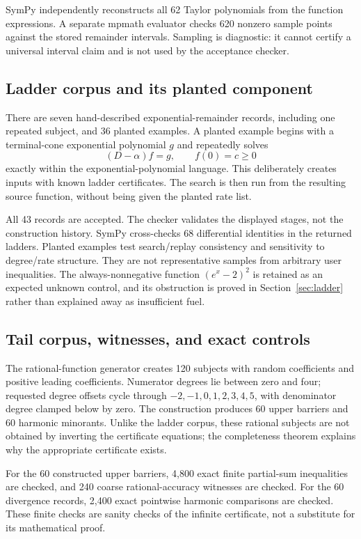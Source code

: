 \documentclass[11pt,a4paper]{article}
\theoremstyle{definition}\newtheorem{definition}[theorem]{Definition}
\newcommand{\Unknown}{\textsf{unknown}}
\begin{document}
SymPy independently reconstructs all 62 Taylor polynomials from the function
expressions. A separate mpmath evaluator checks 620 nonzero sample points against
the stored remainder intervals. Sampling is diagnostic: it cannot certify a
universal interval claim and is not used by the acceptance checker.

\subsection{Ladder corpus and its planted component}

There are seven hand-described exponential-remainder records, including one
repeated subject, and 36 planted examples. A planted example begins with a
terminal-cone exponential polynomial $g$ and repeatedly solves
\[
 (D-\alpha)f=g,\qquad f(0)=c\ge0
\]
exactly within the exponential-polynomial language. This deliberately creates
inputs with known ladder certificates. The search is then run from the resulting
source function, without being given the planted rate list.

All 43 records are accepted. The checker validates the displayed stages, not the
construction history. SymPy cross-checks 68 differential identities in the
returned ladders. Planted examples test search/replay consistency and sensitivity
to degree/rate structure. They are not representative samples from arbitrary
user inequalities. The always-nonnegative function $(e^x-2)^2$ is retained as
an expected \Unknown{} control, and its obstruction is proved in
Section~\ref{sec:ladder} rather than explained away as insufficient fuel.

\subsection{Tail corpus, witnesses, and exact controls}

The rational-function generator creates 120 subjects with random coefficients
and positive leading coefficients. Numerator degrees lie between zero and four;
requested degree offsets cycle through $-2,-1,0,1,2,3,4,5$, with denominator
degree clamped below by zero. The construction produces 60 upper barriers and
60 harmonic minorants. Unlike the ladder corpus, these rational subjects are
not obtained by inverting the certificate equations; the completeness theorem
explains why the appropriate certificate exists.

For the 60 constructed upper barriers, 4,800 exact finite partial-sum
inequalities are checked, and 240 coarse rational-accuracy witnesses are checked.
For the 60 divergence records, 2,400 exact pointwise harmonic comparisons are
checked. These finite checks are sanity checks of the infinite certificate,
not a substitute for its mathematical proof.
\end{document}
